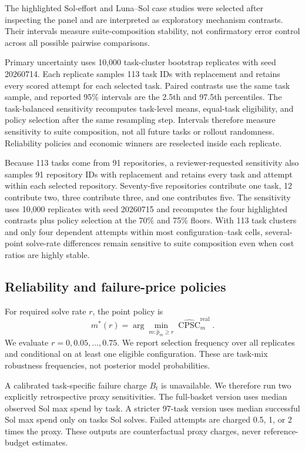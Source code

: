 \documentclass[11pt]{article}
\newcommand{\cpsc}{\operatorname{CPSC}}
\begin{document}
The highlighted Sol-effort and Luna--Sol case studies were selected after inspecting the panel and
are interpreted as exploratory mechanism contrasts. Their intervals measure suite-composition
stability, not confirmatory error control across all possible pairwise comparisons.

Primary uncertainty uses 10,000 task-cluster bootstrap replicates with seed 20260714. Each replicate samples
113 task IDs with replacement and retains every scored attempt for each selected task. Paired
contrasts use the same task sample, and reported 95\% intervals are the 2.5th and 97.5th
percentiles. The task-balanced sensitivity recomputes task-level means, equal-task eligibility,
and policy selection after the same resampling step. Intervals therefore measure sensitivity to
suite composition, not all future tasks or rollout randomness. Reliability policies and economic
winners are reselected inside each replicate.

Because 113 tasks come from 91 repositories, a reviewer-requested sensitivity also samples 91
repository IDs with replacement and retains every task and attempt within each selected repository.
Seventy-five repositories contribute one task, 12 contribute two, three contribute three, and one
contributes five. The sensitivity uses 10,000 replicates with seed 20260715 and recomputes the four
highlighted contrasts plus policy selection at the 70\% and 75\% floors. With 113 task clusters and
only four dependent attempts within most configuration--task cells, several-point solve-rate
differences remain sensitive to suite composition even when cost ratios are highly stable.

\subsection{Reliability and failure-price policies}
\label{sec:failure-policy}

For required solve rate $r$, the point policy is
\begin{equation}
m^*(r)=\arg\min_{m:\widehat p_m\geq r}\widehat{\cpsc}^{\mathrm{real}}_m.
\label{eq:floor}
\end{equation}
We evaluate $r=0,0.05,\ldots,0.75$. We report selection frequency over all replicates and
conditional on at least one eligible configuration. These are task-mix robustness frequencies,
not posterior model probabilities.

A calibrated task-specific failure charge $B_t$ is unavailable. We therefore run two explicitly
retrospective proxy sensitivities. The full-basket version uses median observed Sol max spend by
task. A stricter 97-task version uses median successful Sol max spend only on tasks Sol solves.
Failed attempts are charged 0.5, 1, or 2 times the proxy. These outputs are counterfactual proxy
charges, never reference-budget estimates.
\end{document}
